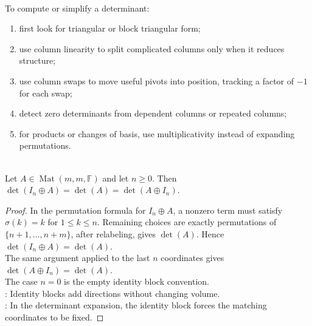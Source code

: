 \begin{method} \label{meth:determinant-by-structure} \\
To compute or simplify a determinant:
\begin{enumerate}[label=(\roman*)]
\setlength{\itemsep}{0pt}
\item first look for triangular or block triangular form;
\item use column linearity to split complicated columns only when it reduces structure;
\item use column swaps to move useful pivots into position, tracking a factor of $-1$ for each swap;
\item detect zero determinants from dependent columns or repeated columns;
\item for products or changes of basis, use multiplicativity instead of expanding permutations.
\end{enumerate}
\end{method}

\begin{lemma} \label{lem:determinant-identity-direct-sum} \\
Let $A\in\operatorname{Mat}(m,m,\mathbb{F})$ and let $n\geq0$. Then $\det(I_n\oplus A)=\det(A)=\det(A\oplus I_n)$.
\begin{proof}
In the permutation formula for $I_n\oplus A$, a nonzero term must satisfy $\sigma(k)=k$ for $1\leq k\leq n$. Remaining choices are exactly permutations of $\{n+1,\ldots,n+m\}$, after relabeling, gives $\det(A)$. Hence $\det(I_n\oplus A)=\det(A)$.\\
The same argument applied to the last $n$ coordinates gives $\det(A\oplus I_n)=\det(A)$.\\
The case $n=0$ is the empty identity block convention.\\
: Identity blocks add directions without changing volume.\\
: In the determinant expansion, the identity block forces the matching coordinates to be fixed.
\end{proof}
\end{lemma}

